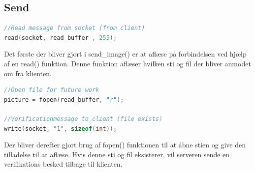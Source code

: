 \documentclass[12pt,fleqn,a4paper]{report}
\begin{document}
\subsection{Send}
\begin{framed}
\begin{lstlisting}[language=C++]
//Read message from socket (from client)
read(socket, read_buffer , 255);
\end{lstlisting}
\end{framed}
 Det første der bliver gjort i send_image() er at aflæse på forbindelsen ved hjælp af en read() funktion. Denne funktion aflæser hvilken sti og fil der bliver anmodet om fra klienten. 
 
\begin{framed}
\begin{lstlisting}[language=C++]
//Open file for future work
picture = fopen(read_buffer, "r");

//Verificationmessage to client (file exists)
write(socket, "1", sizeof(int));
\end{lstlisting}
\end{framed}
Der bliver derefter gjort brug af fopen() funktionen til at åbne stien og give den tilladelse til at aflæse.
Hvis denne sti og fil eksisterer, vil serveren sende en verifikations besked tilbage til klienten.
\end{document}
